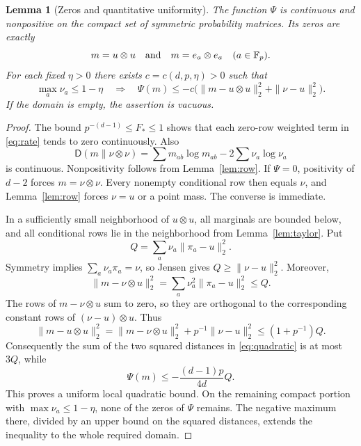 \documentclass[11pt]{article}
\newtheorem{lemma}{Lemma}
\newcommand{\Fp}{\mathbb F_p}
\newcommand{\KL}{\mathsf D}
\begin{document}
\begin{lemma}[Zeros and quantitative uniformity]\label{lem:rate}
The function $\Psi$ is continuous and nonpositive on the compact set
of symmetric probability matrices. Its zeros are exactly
\[
 m=u\otimes u\quad\hbox{and}\quad m=e_a\otimes e_a\quad(a\in\Fp).
\]
For each fixed $\eta>0$ there exists $c=c(d,p,\eta)>0$ such that
\[
 \max_a\nu_a\le1-\eta
 \quad\Longrightarrow\quad
 \Psi(m)\le-c\bigl(\|m-u\otimes u\|_2^2+\|\nu-u\|_2^2\bigr).
 \tag{5}\label{eq:quadratic}
\]
If the domain is empty, the assertion is vacuous.
\end{lemma}
\begin{proof}
The bound $p^{-(d-1)}\le F_*\le1$ shows that each zero-row weighted
term in \eqref{eq:rate} tends to zero continuously. Also
\[
 \KL(m\|\nu\otimes\nu)=\sum m_{ab}\log m_{ab}-2\sum\nu_a\log\nu_a
\]
is continuous. Nonpositivity follows from Lemma~\ref{lem:row}.
If $\Psi=0$, positivity of $d-2$ forces $m=\nu\otimes\nu$.
Every nonempty conditional row then equals $\nu$, and
Lemma~\ref{lem:row} forces $\nu=u$ or a point mass. The converse
is immediate.

In a sufficiently small neighborhood of $u\otimes u$, all marginals
are bounded below, and all conditional rows lie in the neighborhood
from Lemma~\ref{lem:taylor}. Put
\[
 Q=\sum_a\nu_a\|\pi_a-u\|_2^2.
\]
Symmetry implies $\sum_a\nu_a\pi_a=\nu$, so Jensen gives
$Q\ge\|\nu-u\|_2^2$. Moreover,
\[
 \|m-\nu\otimes u\|_2^2
   =\sum_a\nu_a^2\|\pi_a-u\|_2^2\le Q.
\]
The rows of $m-\nu\otimes u$ sum to zero, so they are orthogonal
to the corresponding constant rows of $(\nu-u)\otimes u$. Thus
\[
 \|m-u\otimes u\|_2^2
 =\|m-\nu\otimes u\|_2^2+p^{-1}\|\nu-u\|_2^2
 \le(1+p^{-1})Q.
\]
Consequently the sum of the two squared distances in
\eqref{eq:quadratic} is at most $3Q$, while
\[
 \Psi(m)\le-\frac{(d-1)p}{4d}Q.
\]
This proves a uniform local quadratic bound. On the remaining
compact portion with $\max\nu_a\le1-\eta$, none of the zeros of
$\Psi$ remains. The negative maximum there, divided by an upper
bound on the squared distances, extends the inequality to the
whole required domain.
\end{proof}
\end{document}
